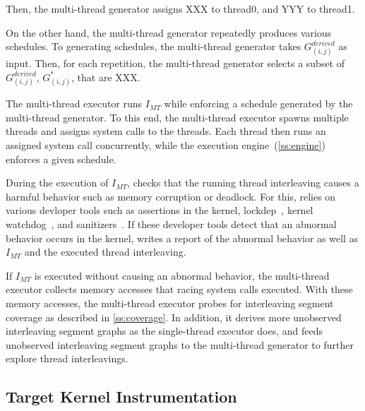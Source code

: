 %
Then, the multi-thread generator assigns XXX to thread0, and YYY to
thread1.




On the other hand, the multi-thread generator repeatedly produces
various schedules.
%
To generating schedules, the multi-thread generator takes
$G^{derived}_{(i,j)}$ as input.
%
Then, for each repetition, the multi-thread generator selects a subset
of $G^{derived}_{(i,j)}$, $G^{*}_{(i,j)}$, that are XXX.






%
The multi-thread executor runs $I_{MT}$ while enforcing a schedule
generated by the multi-thread generator.
%
To this end, the multi-thread executor spawns multiple threads and
assigns system calls to the threads.
%
Each thread then runs an assigned system call concurrently, while
the execution engine~(\autoref{ss:engine}) enforces a given schedule.


During the execution of $I_{MT}$, \sys checks that the running thread
interleaving causes a harmful behavior such as memory corruption or
deadlock.
%
For this, \sys relies on various devloper tools such as assertions in
the kernel, lockdep~\cite{lockdep}, kernel watchdog~\cite{watchdog}, and
sanitizers~\cite{kasan, ubsan, asan}.
%
If these developer tools detect that an abnormal behavior occurs in
the kernel, \sys writes a report of the abnormal behavior as well as
$I_{MT}$ and the executed thread interleaving.







If $I_{MT}$ is executed without causing an abnormal behavior, the
multi-thread executor collects memory accesses that racing system
calls executed.
%
With these memory accesses, the multi-thread executor probes for
interleaving segment coverage as described in
\autoref{ss:coverage}. In addition, it derives more unobserved
interleaving segment graphs as the single-thread executor does, and
feeds unobserved interleaving segment graphs to the multi-thread
generator to further explore thread interleavings.







\subsection{Target Kernel Instrumentation}
\label{ss:instrumentation}

